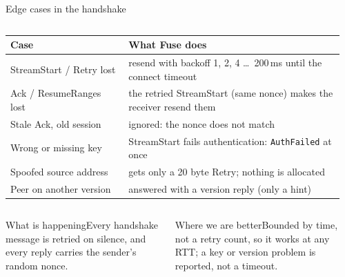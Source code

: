 \documentclass[aspectratio=169,11pt]{beamer}
\newcommand{\happening}[1]{\begin{block}{What is happening}\scriptsize #1\end{block}}
\newcommand{\better}[1]{\begin{block}{Where we are better}\scriptsize #1\end{block}}
\begin{document}
\begin{frame}{Edge cases in the handshake}
  \begin{columns}[T]
    \scriptsize
    \begin{tabular}{@{}p{0.34\linewidth}p{0.62\linewidth}@{}}
      \toprule
      \textbf{Case} & \textbf{What Fuse does} \\
      \midrule
      StreamStart / Retry lost & resend with backoff 1, 2, 4 \dots\ 200\,ms until the connect timeout \\
      Ack / ResumeRanges lost & the retried StreamStart (same nonce) makes the receiver resend them \\
      Stale Ack, old session & ignored: the nonce does not match \\
      Wrong or missing key & StreamStart fails authentication: \texttt{AuthFailed} at once \\
      Spoofed source address & gets only a 20 byte Retry; nothing is allocated \\
      Peer on another version & answered with a version reply (only a hint) \\
      \bottomrule
    \end{tabular}
    \centering
  \end{columns}
  \vspace{2mm}
  \begin{columns}[T]
    \happening{Every handshake message is retried on silence, and every reply carries the sender's random nonce.}
    \better{Bounded by time, not a retry count, so it works at any RTT; a key or version problem is reported, not a timeout.}
  \end{columns}
\end{frame}
\end{document}
